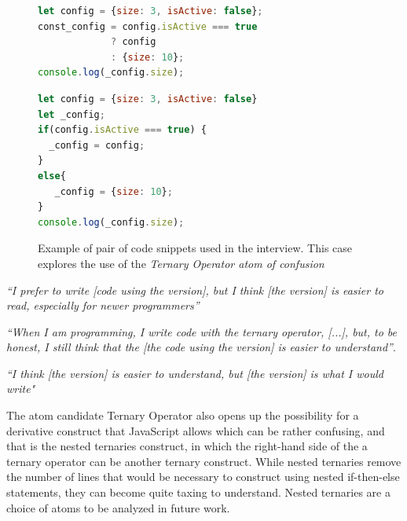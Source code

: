 \begin{figure}

\noindent\begin{minipage}{.45\textwidth}
\begin{lstlisting}[language=JavaScript, caption=\emph{Left-hand side} (using the \emph{Ternary Operator} atom)]
let config = {size: 3, isActive: false};
const_config = config.isActive === true 
             ? config 
             : {size: 10};
console.log(_config.size);
\end{lstlisting}
\end{minipage}\hfill
\begin{minipage}{.45\textwidth}
\begin{lstlisting}[language=JavaScript, caption=\emph{Right-hand side} (without the atom)]
let config = {size: 3, isActive: false}
let _config;
if(config.isActive === true) {
  _config = config;
}
else{
   _config = {size: 10};
}
console.log(_config.size);
\end{lstlisting}
\end{minipage}
\caption{Example of pair of code snippets used in the interview. This case explores the use of the \emph{Ternary Operator atom of confusion}}
\label{code:ternary}
\end{figure}

\begin{mq}
\emph{``I prefer to write [code using the \lhs version], but I think [the \rhs version]  is easier to read, especially for newer programmers''}
\end{mq}

\begin{mq}
\emph{``When I am programming, I write code with the ternary operator, [...], but, to be honest, I still think that the [the code using the \lhs version] is easier to understand''}.
\end{mq}

\begin{mq}
\emph{``I think [the \lhs version] is easier to understand, but [the \rhs version] is what I would write"}
\end{mq}

The atom candidate Ternary Operator also opens up
the possibility for a derivative construct that JavaScript
allows which can be rather confusing, and that is the nested
ternaries construct, in which the right-hand side of the a
ternary operator can be another ternary construct.
While nested ternaries remove the number of lines that
would be necessary to construct using nested if-then-else statements,
they can become quite taxing to understand.
Nested ternaries are a choice of atoms to be analyzed in future work.

